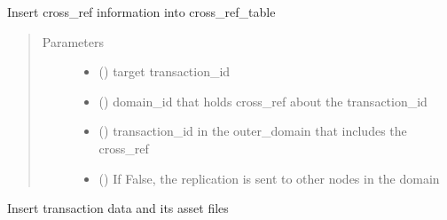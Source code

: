 \documentclass[letterpaper,10pt,english]{sphinxmanual}
\begin{document}
\begin{fulllineitems}

\begin{fulllineitems}
\label{\detokenize{bbc1.core.data_handler:bbc1.core.data_handler.DataHandler.insert_cross_ref}}
Insert cross\_ref information into cross\_ref\_table
\begin{quote}\begin{description}
\item[{Parameters}] \leavevmode\begin{itemize}
\item {} 
 () \textendash{} target transaction\_id

\item {} 
 () \textendash{} domain\_id that holds cross\_ref about the transaction\_id

\item {} 
 () \textendash{} transaction\_id in the outer\_domain that includes the cross\_ref

\item {} 
 () \textendash{} If False, the replication is sent to other nodes in the domain

\end{itemize}

\end{description}\end{quote}

\end{fulllineitems}


\begin{fulllineitems}
\label{\detokenize{bbc1.core.data_handler:bbc1.core.data_handler.DataHandler.insert_transaction}}
Insert transaction data and its asset files


\end{fulllineitems}
\end{fulllineitems}
\end{document}

